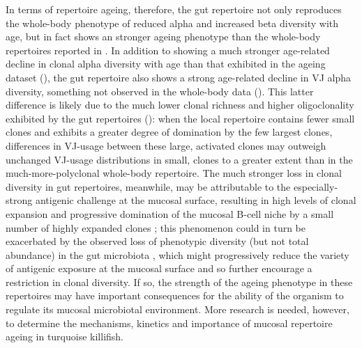 In terms of repertoire ageing, therefore, the gut repertoire not only reproduces the whole-body phenotype of reduced alpha and increased beta diversity with age, but in fact shows an stronger ageing phenotype than the whole-body repertoires reported in . In addition to showing a much stronger age-related decline in clonal alpha diversity with age than that exhibited in the ageing dataset (), the gut repertoire also shows a strong age-related decline in VJ alpha diversity, something not observed in the whole-body data (). This latter difference is likely due to the much lower clonal richness and higher oligoclonality exhibited by the gut repertoires (): when the local repertoire contains fewer small \naive clones and exhibits a greater degree of domination by the few largest clones, differences in VJ-usage between these large, activated clones may outweigh unchanged VJ-usage distributions in small, \naive clones to a greater extent than in the much-more-polyclonal whole-body repertoire. The much stronger loss in clonal diversity in gut repertoires, meanwhile, may be attributable to the especially-strong antigenic challenge at the mucosal surface, resulting in high levels of clonal expansion and progressive domination of the mucosal B-cell niche by a small number of highly expanded clones \parencite{caruso2009immunosenescence}; this phenomenon could in turn be exacerbated by the observed loss of phenotypic diversity (but not total abundance) in the gut microbiota \parencite{smith2017microbiota}, which might progressively reduce the variety of antigenic exposure at the mucosal surface and so further encourage a restriction in clonal diversity. If so, the strength of the ageing phenotype in these repertoires may have important consequences for the ability of the organism to regulate its mucosal microbiotal environment. More research is needed, however, to determine the mechanisms, kinetics and importance of mucosal repertoire ageing in turquoise killifish.

